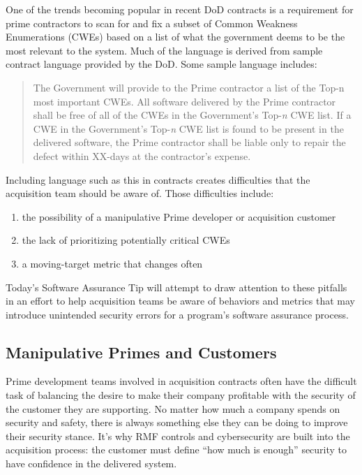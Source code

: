 One of the trends becoming popular in recent DoD contracts is a requirement for prime contractors to scan for and fix a subset of Common Weakness Enumerations (CWEs) based on a list of what the government deems to be the most relevant to the system. Much of the language is derived from sample contract language provided by the DoD. Some sample language includes:
\begin{quote}
The Government will provide to the Prime contractor a list of the Top-n most important CWEs. All software delivered by the Prime contractor shall be free of all of the CWEs in the Government's Top-\textit{n} CWE list. If a CWE in the Government's Top-\textit{n} CWE list is found to be present in the delivered software, the Prime contractor shall be liable only to repair the defect within XX-days at the contractor's expense.\autocite{20220613:marien}
\end{quote}

Including language such as this in contracts creates difficulties that the acquisition team should be aware of. Those difficulties include:
\begin{enumerate}
	\item the possibility of a manipulative Prime developer or acquisition customer
	\item the lack of prioritizing potentially critical CWEs
	\item a moving-target metric that changes often
\end{enumerate}

Today's Software Assurance Tip will attempt to draw attention to these pitfalls in an effort to help acquisition teams be aware of behaviors and metrics that may introduce unintended security errors for a program's software assurance process.

\subsection{Manipulative Primes and Customers}
Prime development teams involved in acquisition contracts often have the difficult task of balancing the desire to make their company profitable with the security of the customer they are supporting. No matter how much a company spends on security and safety, there is always something else they can be doing to improve their security stance. It's why RMF controls and cybersecurity are built into the acquisition process: the customer must define ``how much is enough'' security to have confidence in the delivered system.

